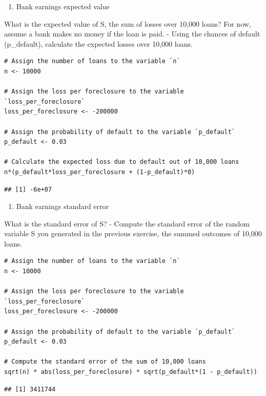 \documentclass[
]{article}
\providecommand{\tightlist}{%
  \setlength{\itemsep}{0pt}\setlength{\parskip}{0pt}}
\begin{document}
\begin{enumerate}
\def\labelenumi{\arabic{enumi}.}
\setcounter{enumi}{2}
\tightlist
\item
  Bank earnings expected value
\end{enumerate}

What is the expected value of S, the sum of losses over 10,000 loans?
For now, assume a bank makes no money if the loan is paid. - Using the
chances of default (p\_default), calculate the expected losses over
10,000 loans.

\begin{verbatim}
# Assign the number of loans to the variable `n`
n <- 10000

# Assign the loss per foreclosure to the variable `loss_per_foreclosure`
loss_per_foreclosure <- -200000

# Assign the probability of default to the variable `p_default`
p_default <- 0.03

# Calculate the expected loss due to default out of 10,000 loans
n*(p_default*loss_per_foreclosure + (1-p_default)*0)
\end{verbatim}

\begin{verbatim}
## [1] -6e+07
\end{verbatim}

\begin{enumerate}
\def\labelenumi{\arabic{enumi}.}
\setcounter{enumi}{3}
\tightlist
\item
  Bank earnings standard error
\end{enumerate}

What is the standard error of S? - Compute the standard error of the
random variable S you generated in the previous exercise, the summed
outcomes of 10,000 loans.

\begin{verbatim}
# Assign the number of loans to the variable `n`
n <- 10000

# Assign the loss per foreclosure to the variable `loss_per_foreclosure`
loss_per_foreclosure <- -200000

# Assign the probability of default to the variable `p_default`
p_default <- 0.03

# Compute the standard error of the sum of 10,000 loans
sqrt(n) * abs(loss_per_foreclosure) * sqrt(p_default*(1 - p_default))
\end{verbatim}

\begin{verbatim}
## [1] 3411744
\end{verbatim}
\end{document}
